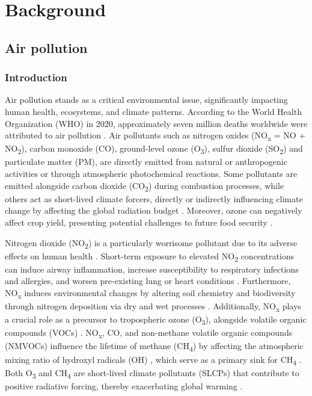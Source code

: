 \chapter{Background} \label{chap2}
\renewcommand{\headrulewidth}{0pt}
\lhead[\thepage]{\leftmark}
\rhead[\leftmark]{\thepage}
\cfoot[]{}

\section{Air pollution}
\subsection{Introduction}

Air pollution stands as a critical environmental issue, significantly impacting human health, ecosystems, and climate patterns. According to the World Health Organization (WHO) in 2020, approximately seven million deaths worldwide were attributed to air pollution \citep{who2020world}. Air pollutants such as nitrogen oxides (NO\textsubscript{x} = NO + NO\textsubscript{2}), carbon monoxide (CO), ground-level ozone (O\textsubscript{3}), sulfur dioxide (SO\textsubscript{2}) and particulate matter (PM), are directly emitted from natural or anthropogenic activities or through atmospheric photochemical reactions. Some pollutants are emitted alongside carbon dioxide (CO\textsubscript{2}) during combustion processes, while others act as short-lived climate forcers, directly or indirectly influencing climate change by affecting the global radiation budget \citep{RN3}. Moreover, ozone can negatively affect crop yield, presenting potential challenges to future food security \citep{avnery2011global, avnery2011global2, chuwah2015global, tai2017impacts}. \par
Nitrogen dioxide (NO\textsubscript{2}) is a particularly worrisome pollutant due to its adverse effects on human health \citep{hamra2015lung}. Short-term exposure to elevated NO\textsubscript{2} concentrations can induce airway inflammation, increase susceptibility to respiratory infections and allergies, and worsen pre-existing lung or heart conditions \citep{bono2016air, kelly2011air}. Furthermore, NO\textsubscript{x} induces environmental changes by altering soil chemistry and biodiversity through nitrogen deposition via dry and wet processes \citep{bobbink2010global}. Additionally, NO\textsubscript{x} plays a crucial role as a precursor to tropospheric ozone (O\textsubscript{3}), alongside volatile organic compounds (VOCs) \citep{akimoto2022rethinking}. NO\textsubscript{x}, CO, and non-methane volatile organic compounds (NMVOCs) influence the lifetime of methane (CH\textsubscript{4}) by affecting the atmospheric mixing ratio of hydroxyl radicals (OH) \citep{akimoto2022rethinking}, which serve as a primary sink for CH\textsubscript{4} \citep{turner2019interpreting}. Both O\textsubscript{3} and CH\textsubscript{4} are short-lived climate pollutants (SLCPs) that contribute to positive radiative forcing, thereby exacerbating global warming \citep{akimoto2022rethinking}. \par

